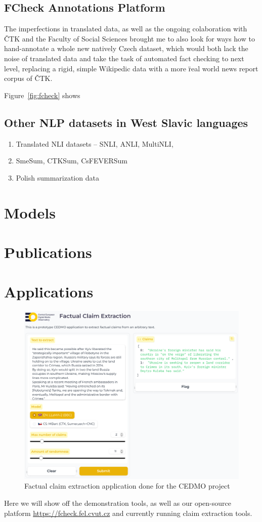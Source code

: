 \subsection{FCheck Annotations Platform}
The imperfections in translated \FCZ data, as well as the ongoing colaboration with ČTK and the Faculty of Social Sciences brought me to also look for ways how to hand-annotate a whole new natively Czech dataset, which would both lack the noise of translated data and take the task of automated fact checking to next level, replacing a rigid, simple Wikipedic data with a more \"{real world} news report corpus of ČTK.

Figure~\ref{fig:fcheck} shows 
\subsection{\CTK}
\subsection{Other NLP datasets in West Slavic languages}
\begin{enumerate}
    \item {\techbf Translated NLI datasets} -- SNLI, ANLI, MultiNLI, 
    \item SmeSum, CTKSum, CsFEVERSum
    \item Polish summarization data
\end{enumerate}
\section{Models}
\label{sec:models}
\section{Publications}
\label{sec:publications}
\section{Applications}
\label{sec:applications}

\begin{figure}
    \includegraphics[width=16cm]{fig/cedmo.pdf}
    \caption{Factual claim extraction application done for the CEDMO project}
    \label{fig:framework}
\end{figure}

Here we will show off the demonstration tools, as well as our open-source platform \url{https://fcheck.fel.cvut.cz} and currently running claim extraction tools. 